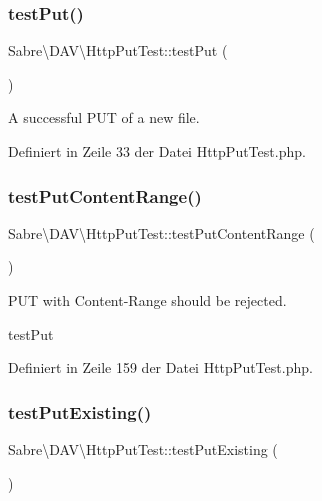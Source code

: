 \subsubsection{\texorpdfstring{test\+Put()}{testPut()}}
{\footnotesize\ttfamily Sabre\textbackslash{}\+D\+A\+V\textbackslash{}\+Http\+Put\+Test\+::test\+Put (\begin{DoxyParamCaption}{ }\end{DoxyParamCaption})}

A successful P\+UT of a new file. 

Definiert in Zeile 33 der Datei Http\+Put\+Test.\+php.

\mbox{\label{class_sabre_1_1_d_a_v_1_1_http_put_test_aef4b187a05add47e008397b03d54941a}} 
\subsubsection{\texorpdfstring{test\+Put\+Content\+Range()}{testPutContentRange()}}
{\footnotesize\ttfamily Sabre\textbackslash{}\+D\+A\+V\textbackslash{}\+Http\+Put\+Test\+::test\+Put\+Content\+Range (\begin{DoxyParamCaption}{ }\end{DoxyParamCaption})}

P\+UT with Content-\/\+Range should be rejected.

test\+Put 

Definiert in Zeile 159 der Datei Http\+Put\+Test.\+php.

\mbox{\label{class_sabre_1_1_d_a_v_1_1_http_put_test_a251a4be91f59d2e484cf5a9d43588943}} 
\subsubsection{\texorpdfstring{test\+Put\+Existing()}{testPutExisting()}}
{\footnotesize\ttfamily Sabre\textbackslash{}\+D\+A\+V\textbackslash{}\+Http\+Put\+Test\+::test\+Put\+Existing (\begin{DoxyParamCaption}{ }\end{DoxyParamCaption})}

